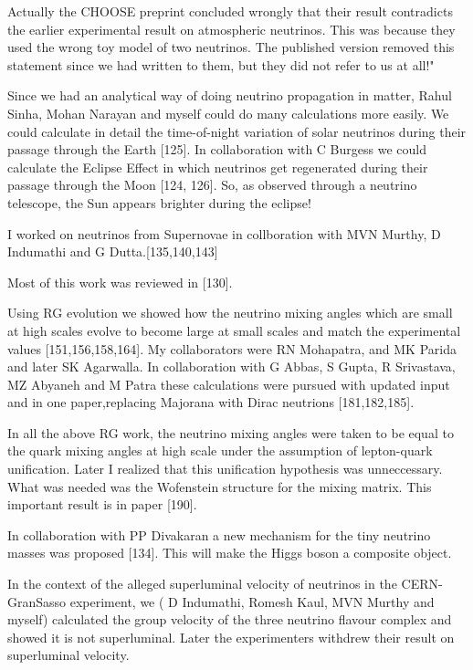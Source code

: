 Actually the CHOOSE preprint concluded wrongly that their result 
contradicts the earlier experimental result on atmospheric neutrinos. 
This was because they used the wrong toy model of two neutrinos. The 
published version removed this statement since we had written to them, 
but they did not refer to us at all!"

Since we had an analytical way of doing neutrino propagation in matter, 
Rahul Sinha, Mohan Narayan and myself could do many calculations more 
easily. We could calculate in detail the time-of-night variation of 
solar neutrinos during their passage through the Earth [125]. In 
collaboration with C Burgess we could calculate the Eclipse Effect in 
which neutrinos get regenerated during their passage through the Moon 
[124, 126]. So, as observed through a neutrino telescope, the Sun 
appears brighter during the eclipse!

I worked on neutrinos from Supernovae in collboration with MVN Murthy, D 
Indumathi and G Dutta.[135,140,143]

Most of this work was reviewed in [130].

Using RG evolution we showed how the neutrino mixing angles which are 
small at high scales evolve to become large at small scales and match 
the experimental values [151,156,158,164]. My collaborators were RN 
Mohapatra, and MK Parida and later SK Agarwalla. In collaboration with G 
Abbas, S Gupta, R Srivastava, MZ Abyaneh and M Patra these calculations 
were pursued with updated input and in one paper,replacing Majorana with 
Dirac neutrions [181,182,185].

In all the above RG work, the neutrino mixing angles were taken to be 
equal to the quark mixing angles at high scale under the assumption of 
lepton-quark unification. Later I realized that this unification 
hypothesis was unneccessary. What was needed was the Wofenstein 
structure for the mixing matrix. This important result is in paper 
[190].

In collaboration with PP Divakaran a new mechanism for the tiny neutrino 
masses was proposed [134]. This will make the Higgs boson a composite 
object.

In the context of the alleged superluminal velocity of neutrinos in the 
CERN-GranSasso experiment, we ( D Indumathi, Romesh Kaul, MVN Murthy and 
myself) calculated the group velocity of the three neutrino flavour 
complex and showed it is not superluminal. Later the experimenters 
withdrew their result on superluminal velocity.

